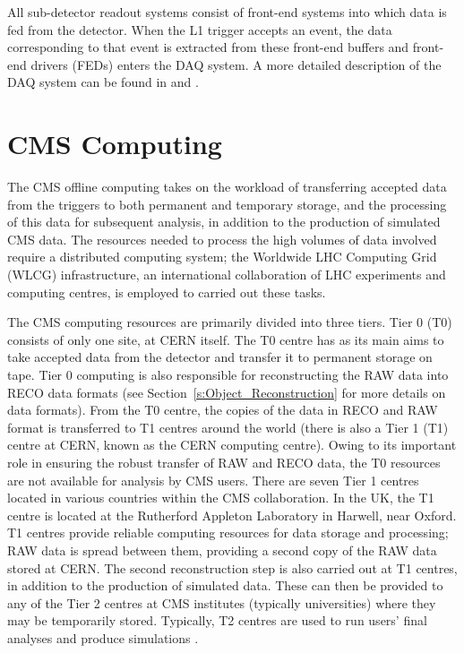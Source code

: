 All sub-detector readout systems consist of front-end systems into which data is fed from the detector.
When the L1 trigger accepts an event, the data corresponding to that event is extracted from these front-end
buffers and front-end drivers (FEDs) enters the DAQ system. A more detailed description of the DAQ system can
be found in \cite{CMS_experiment} and \cite{CMS_TDR1}.

\section{CMS Computing}
\label{s:CMS_computing}

The CMS offline computing takes on the workload of transferring accepted data from the triggers to both
permanent and temporary storage, and the processing of this data for subsequent analysis, in addition to the
production of simulated CMS data. The resources needed to process the high volumes of data involved require a
distributed computing system; the Worldwide LHC Computing Grid (WLCG) infrastructure, an international
collaboration of LHC experiments and computing centres, is employed to carried out these tasks.

The CMS computing resources are primarily divided into three tiers. Tier 0 (T0) consists of only one site, at
CERN itself. The T0 centre has as its main aims to take accepted data from the detector and transfer it to
permanent storage on tape. Tier 0 computing is also responsible for reconstructing the RAW data into RECO data
formats (see Section~\ref{s:Object_Reconstruction} for more details on data formats). From the T0 centre, the
copies of the data in RECO and RAW format is transferred to T1 centres around the world (there is also a Tier
1 (T1) centre at CERN, known as the CERN computing centre). Owing to its important role in ensuring the robust
transfer of RAW and RECO data, the T0 resources are not available for analysis by CMS users. There are seven
Tier 1 centres located in various countries within the CMS collaboration. In the UK, the T1 centre is located
at the Rutherford Appleton Laboratory in Harwell, near Oxford. T1 centres provide reliable computing resources
for data storage and processing; RAW data is spread between them, providing a second copy of the RAW data
stored at CERN. The second reconstruction step is also carried out at T1 centres, in addition to the
production of simulated data. These can then be provided to any of the Tier 2 centres at CMS institutes
(typically universities) where they may be temporarily stored. Typically, T2 centres are used to run users'
final analyses and produce simulations \cite{CMS_experiment,CMS_TDR1}.

